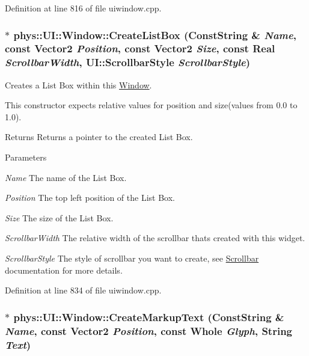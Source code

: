 Definition at line 816 of file uiwindow.cpp.

\hypertarget{classphys_1_1UI_1_1Window_a4bb271eb2307dd1b223c4b009f75e02f}{
\subsubsection[{CreateListBox}]{ $\ast$ phys::UI::Window::CreateListBox ({\bf ConstString} \& {\em Name}, \/  const {\bf Vector2} {\em Position}, \/  const {\bf Vector2} {\em Size}, \/  const {\bf Real} {\em ScrollbarWidth}, \/  UI::ScrollbarStyle {\em ScrollbarStyle})}}
\label{d4/d86/classphys_1_1UI_1_1Window_a4bb271eb2307dd1b223c4b009f75e02f}


Creates a List Box within this \hyperlink{classphys_1_1UI_1_1Window}{Window}. 

This constructor expects relative values for position and size(values from 0.0 to 1.0). \begin{DoxyReturn}{Returns}
Returns a pointer to the created List Box. 
\end{DoxyReturn}

\begin{DoxyParams}{Parameters}
\item[{\em Name}]The name of the List Box. \item[{\em Position}]The top left position of the List Box. \item[{\em Size}]The size of the List Box. \item[{\em ScrollbarWidth}]The relative width of the scrollbar thats created with this widget. \item[{\em ScrollbarStyle}]The style of scrollbar you want to create, see \hyperlink{classphys_1_1UI_1_1Scrollbar}{Scrollbar} documentation for more details. \end{DoxyParams}


Definition at line 834 of file uiwindow.cpp.

\hypertarget{classphys_1_1UI_1_1Window_a39e80f1bf3dcf3441c107b359b888305}{
\subsubsection[{CreateMarkupText}]{ $\ast$ phys::UI::Window::CreateMarkupText ({\bf ConstString} \& {\em Name}, \/  const {\bf Vector2} {\em Position}, \/  const {\bf Whole} {\em Glyph}, \/  {\bf String} {\em Text})}}
\label{d4/d86/classphys_1_1UI_1_1Window_a39e80f1bf3dcf3441c107b359b888305}


